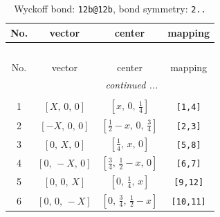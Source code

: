 \documentclass[fleqn,8pt]{jsarticle}
\begin{document}
\begin{longtable}{cccc}
\caption{Wyckoff bond: {\tt 12b@12b}, bond symmetry: {\tt 2..}}
 \\
 \hline \hline
No. & vector & center & mapping \\ \hline \endfirsthead

\multicolumn{3}{l}{\tablename\ \thetable{}} \\
 \hline \hline
No. & vector & center & mapping \\ \hline \endhead

 \hline \hline
\multicolumn{3}{r}{\footnotesize\it continued ...} \\ \endfoot

 \hline \hline
\multicolumn{3}{r}{} \\ \endlastfoot

1 & $\left[ X,\, 0,\, 0 \right]$ & $\left[ x,\, 0,\, \frac{1}{4} \right]$ & {\tt [1,4]} \\ \hline
2 & $\left[ - X,\, 0,\, 0 \right]$ & $\left[ \frac{1}{2} - x,\, 0,\, \frac{3}{4} \right]$ & {\tt [2,3]} \\ \hline
3 & $\left[ 0,\, X,\, 0 \right]$ & $\left[ \frac{1}{4},\, x,\, 0 \right]$ & {\tt [5,8]} \\ \hline
4 & $\left[ 0,\, - X,\, 0 \right]$ & $\left[ \frac{3}{4},\, \frac{1}{2} - x,\, 0 \right]$ & {\tt [6,7]} \\ \hline
5 & $\left[ 0,\, 0,\, X \right]$ & $\left[ 0,\, \frac{1}{4},\, x \right]$ & {\tt [9,12]} \\ \hline
6 & $\left[ 0,\, 0,\, - X \right]$ & $\left[ 0,\, \frac{3}{4},\, \frac{1}{2} - x \right]$ & {\tt [10,11]} \\
\end{longtable}
\renewcommand{\arraystretch}{1.2}
\end{document}
